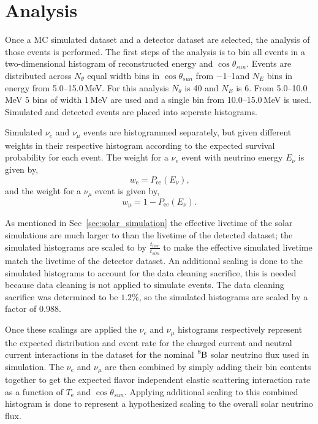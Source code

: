 \section{Analysis}
Once a MC simulated dataset and a detector dataset are selected, the analysis
of those events is performed.
The first steps of the analysis is to bin all events
in a two-dimensional histogram of reconstructed energy and $\cos\theta_{sun}$.
Events are distributed across $N_{\theta}$ equal width bins in $\cos\theta_{sun}$ from
\numrange{-1}{1}and
$N_{E}$ bins in energy from \numrange{5.0}{15.0}\,MeV.
For this analysis $N_{\theta}$ is 40 and $N_{E}$ is 6.
From \numrange{5.0}{10.0}\,MeV $5$ bins of width $1$\,MeV are used and
a single bin from \numrange{10.0}{15.0}\,MeV is used.
Simulated and detected events are placed into seperate histograms.

Simulated $\nu_{e}$ and $\nu_{\mu}$ events are histogrammed separately,
but given different weights in their respective histogram according to the expected survival probability
for each event.
The weight for a $\nu_{e}$ event with neutrino energy $E_{\nu}$ is given by,
\begin{equation}
    w_{\mathrm{e}} = P_{\mathrm{ee}}(E_{\nu})\text{,}
\end{equation}
and the weight for a $\nu_{\mu}$ event is given by,
\begin{equation}
    w_{\mathrm{\mu}} = 1 - P_{\mathrm{ee}}(E_{\nu})\text{.}
\end{equation}

As mentioned in Sec~\ref{sec:solar_simulation}%
the effective livetime of the solar simulations are much larger to than
the livetime of the detected dataset; the simulated histograms are
scaled to by $\frac{t_{live}}{t_{sim}}$ to make the effective simulated
livetime match the livetime of the detector dataset.
An additional scaling is done to the simulated histograms to account
for the data cleaning sacrifice, this is needed because data cleaning
is not applied to simulate events.
The data cleaning sacrifice was determined to be $1.2\%$, so the
simulated histograms are scaled by a factor of $0.988$.

Once these scalings are applied the $\nu_{e}$ and $\nu_{\mu}$ histograms
respectively  represent the expected distribution and event rate for the charged current
and neutral current interactions in the dataset for the nominal $\ce{^{8}B}$
solar neutrino flux used in simulation.
The $\nu_{e}$ and $\nu_{\mu}$ are then combined by
simply adding their bin contents together to get the expected
flavor independent elastic scattering interaction rate as a function
of $T_{\mathrm{e}}$ and $\cos\theta_{sun}$.
Applying additional scaling to this combined histogram is done to represent
a hypothesized scaling to the overall solar neutrino flux.

